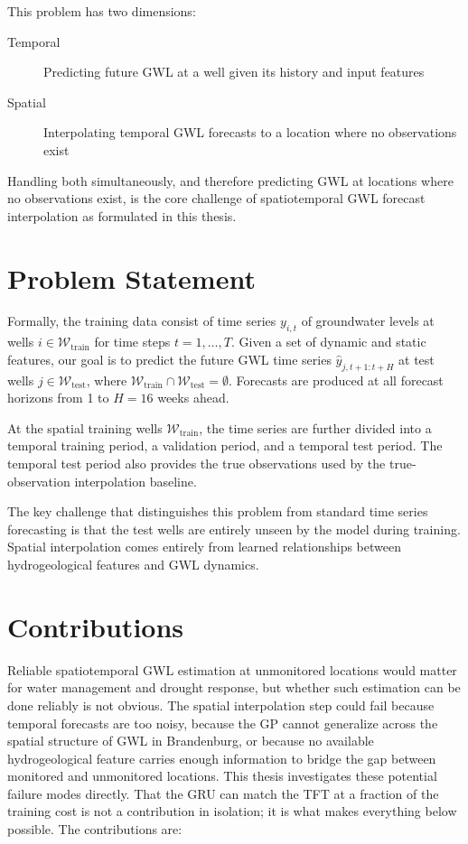 This problem has two dimensions:

\begin{description}
  \item[Temporal] Predicting future GWL at a well given its history and input features
  \item[Spatial] Interpolating temporal GWL forecasts to a location where no observations exist
\end{description}

Handling both simultaneously, and therefore predicting GWL at locations where no observations
exist, is the core challenge of spatiotemporal GWL forecast interpolation as formulated in this thesis.

\section{Problem Statement}
\label{sec:problem_statement}

Formally, the training data consist of time series $y_{i,t}$ of groundwater levels at wells 
$i \in \mathcal{W}_\text{train}$ for time steps $t = 1, \ldots, T$. Given a set of dynamic 
and static features, our goal is to predict the future GWL time series $\hat{y}_{j, t+1:t+H}$ at
test wells $j \in \mathcal{W}_\text{test}$, where $\mathcal{W}_\text{train} \cap
\mathcal{W}_\text{test} = \emptyset$. Forecasts are produced at all forecast horizons from 1 to $H = 16$ weeks ahead.

At the spatial training wells $\mathcal{W}_\text{train}$, the time series are further divided into a temporal training period, a validation period, and a temporal test period. The temporal test period also provides the true observations used by the true-observation interpolation baseline.

The key challenge that distinguishes this problem from standard time series forecasting is that 
the test wells are entirely unseen by the model during training. Spatial interpolation comes 
entirely from learned relationships between hydrogeological features and GWL dynamics.

\section{Contributions}
\label{sec:contributions}

Reliable spatiotemporal GWL estimation at unmonitored locations would matter for water management and drought response, but whether such estimation can be done reliably is not obvious. The spatial interpolation step could fail because temporal forecasts are too noisy, because the GP cannot generalize across the spatial structure of GWL in Brandenburg, or because no available hydrogeological feature carries enough information to bridge the gap between monitored and unmonitored locations. This thesis investigates these potential failure modes directly. That the GRU can match the TFT at a fraction of the training cost is not a contribution in isolation; it is what makes everything below possible. The contributions are:

